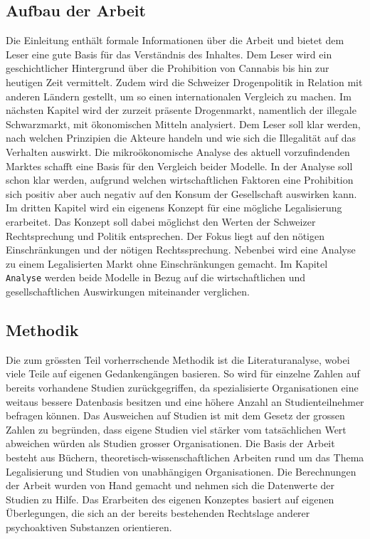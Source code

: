 \documentclass[../main.tex]{subfiles}
\begin{document}
	 \subsection{Aufbau der Arbeit}
	 Die Einleitung enthält formale Informationen über die Arbeit und bietet dem Leser eine gute Basis für das Verständnis des Inhaltes. 
	 Dem Leser wird ein geschichtlicher Hintergrund über die Prohibition von Cannabis bis hin zur heutigen Zeit vermittelt. 
	 Zudem wird die Schweizer Drogenpolitik in Relation mit anderen Ländern gestellt, um so einen internationalen Vergleich zu machen.
	 Im nächsten Kapitel wird der zurzeit präsente Drogenmarkt, namentlich der illegale Schwarzmarkt, mit ökonomischen Mitteln analysiert. 
	 Dem Leser soll klar werden, nach welchen Prinzipien die Akteure handeln und wie sich die Illegalität auf das Verhalten auswirkt.
	 Die mikroökonomische Analyse des aktuell vorzufindenden Marktes schafft eine Basis für den Vergleich beider Modelle.
	 In der Analyse soll schon klar werden, aufgrund welchen wirtschaftlichen Faktoren eine Prohibition sich positiv aber auch negativ auf den Konsum der Gesellschaft auswirken kann. 
	 Im dritten Kapitel wird ein eigenens Konzept für eine mögliche Legalisierung erarbeitet. 
	 Das Konzept soll dabei möglichst den Werten der Schweizer Rechtsprechung und Politik entsprechen.
	 Der Fokus liegt auf den nötigen Einschränkungen und der nötigen Rechtssprechung.
	 Nebenbei wird eine Analyse zu einem Legalisierten Markt ohne Einschränkungen gemacht.
	 Im Kapitel \texttt{Analyse} werden beide Modelle in Bezug auf die wirtschaftlichen und gesellschaftlichen Auswirkungen miteinander verglichen. 
	 
	 
	 
	 \subsection{Methodik}
	 Die zum grössten Teil vorherrschende Methodik ist die Literaturanalyse, wobei viele Teile auf eigenen Gedankengängen basieren. 
	 So wird für einzelne Zahlen auf bereits vorhandene Studien zurückgegriffen, da spezialisierte Organisationen eine weitaus bessere Datenbasis besitzen und eine höhere Anzahl an Studienteilnehmer befragen können. 
	 Das Ausweichen auf Studien ist mit dem Gesetz der grossen Zahlen zu begründen, dass eigene Studien viel stärker vom tatsächlichen Wert abweichen würden als Studien grosser Organisationen.
	 Die Basis der Arbeit besteht aus Büchern, theoretisch-wissenschaftlichen Arbeiten rund um das Thema Legalisierung und Studien von unabhängigen Organisationen.
	 Die Berechnungen der Arbeit wurden von Hand gemacht und nehmen sich die Datenwerte der Studien zu Hilfe.
	 Das Erarbeiten des eigenen Konzeptes basiert auf eigenen Überlegungen, die sich an der bereits bestehenden Rechtslage anderer psychoaktiven Substanzen orientieren.
	 
\end{document}
